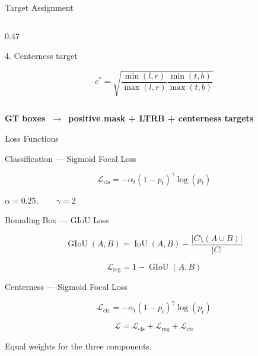 \documentclass[aspectratio=169,11pt]{beamer}
\begin{document}
\begin{frame}{Target Assignment}
\begin{columns}[t]
\begin{column}{0.47\textwidth}
\vspace{0.12cm}

\begin{block}{4. Centerness target}
\footnotesize

\[
c^*=
\sqrt{
\frac{\min(l,r)}{\max(l,r)}
\frac{\min(t,b)}{\max(t,b)}
}
\]

\end{block}

\end{column}

\end{columns}

\vspace{0.05cm}

\centering
{\scriptsize
\textbf{GT boxes} $\;\longrightarrow\;$ 
\textbf{positive mask + LTRB + centerness targets}
}

\end{frame}



\begin{frame}{Loss Functions}

\begin{block}{Classification --- Sigmoid Focal Loss}

\[
\mathcal{L}_{\mathrm{cls}}
=
-\alpha_t(1-p_t)^\gamma \log(p_t)
\]

\centering
{\footnotesize $\alpha=0.25,\qquad \gamma=2$}

\end{block}

\vspace{0.15cm}

\begin{block}{Bounding Box --- GIoU Loss}

\[
\operatorname{GIoU}(A,B)
=
\operatorname{IoU}(A,B)
-
\frac{|C\setminus(A\cup B)|}{|C|}
\]

\[
\mathcal{L}_{\mathrm{reg}}=1-\operatorname{GIoU}(A,B)
\]

\end{block}

\vspace{0.15cm}

\begin{block}{Centerness --- Sigmoid Focal Loss}

\[
\mathcal{L}_{\mathrm{ctr}}
=
-\alpha_t(1-p_t)^\gamma\log(p_t)
\]

\end{block}

\vspace{0.12cm}

\centering
\[
\boxed{
\mathcal{L}
=
\mathcal{L}_{\mathrm{cls}}
+
\mathcal{L}_{\mathrm{reg}}
+
\mathcal{L}_{\mathrm{ctr}}
}
\]

{\footnotesize Equal weights for the three components.}

\end{frame}
\end{document}
